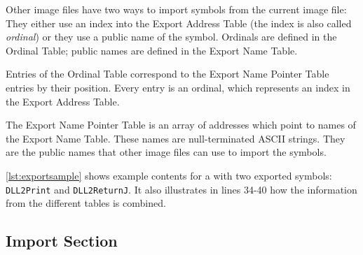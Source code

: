 Other image files have two ways to import symbols from the current image file: They either use an index into the Export Address Table (the index is also called \emph{ordinal}) or they use a public name of the symbol. Ordinals are defined in the Ordinal Table; public names are defined in the Export Name Table.

Entries of the Ordinal Table correspond to the Export Name Pointer Table entries by their position. Every entry is an ordinal, which represents an index in the Export Address Table.

The Export Name Pointer Table is an array of addresses which point to names of the Export Name Table. These names are null-terminated ASCII strings. They are the public names that other image files can use to import the symbols.

\autoref{lst:exportsample} shows example contents for a \DLL{} with two exported symbols: \texttt{DLL2Print} and \texttt{DLL2ReturnJ}. It also illustrates in lines 34-40 how the information from the different tables is combined.



\subsection*{Import Section}

